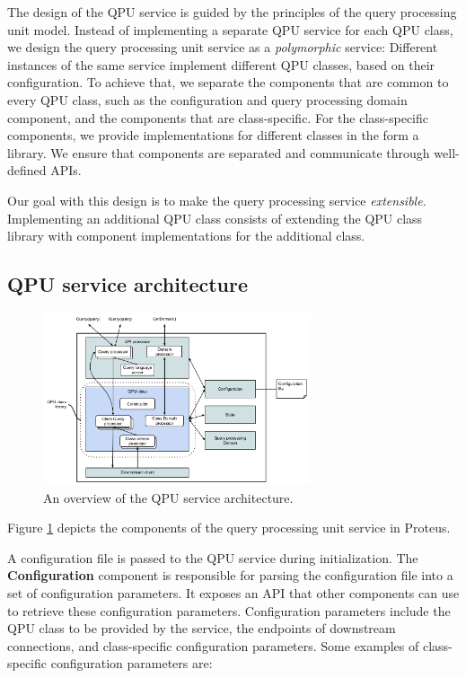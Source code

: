The design of the QPU service is guided by the principles of the query processing unit model.
Instead of implementing a separate QPU service for each QPU class,
we design the query processing unit service as a \textit{polymorphic} service:
Different instances of the same service implement different QPU classes, based on their configuration.
To achieve that, we separate the components that are common to every QPU class,
such as the configuration and query processing domain component,
and the components that are class-specific.
For the class-specific components, we provide implementations for different classes in the form a library.
We ensure that components are separated and communicate through well-defined APIs.

Our goal with this design is to make the query processing service \textit{extensible}.
Implementing an additional QPU class consists of extending the QPU class library with component implementations
for the additional class.

\subsection{QPU service architecture}

\begin{figure}
  \centering
    \includegraphics[width=0.7\textwidth]{./figures/proteus/QPU_architecture.pdf}
  \caption{An overview of the QPU service architecture.}
  \label{fig:qpu_arch}
\end{figure}

\medskip
\noindent
Figure \ref{fig:qpu_arch} depicts the components of the query processing unit service in Proteus.

A configuration file is passed to the QPU service during initialization.
The \textbf{Configuration} component is responsible for parsing the configuration file into a set of configuration parameters.
It exposes an API that other components can use to retrieve these configuration parameters.
Configuration parameters include the QPU class to be provided by the service,
the endpoints of downstream connections, and class-specific configuration parameters.
Some examples of class-specific configuration parameters are:

